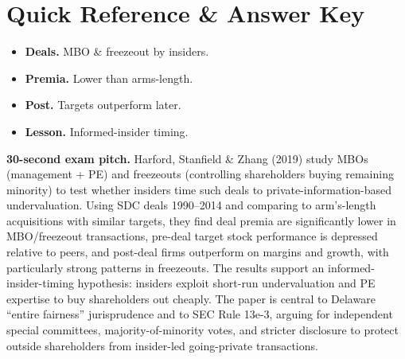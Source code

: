\documentclass[11pt]{article}
\begin{document}
\section*{Quick Reference \& Answer Key}
\begin{answerbox}
\begin{itemize}
\item \textbf{Deals.} MBO \& freezeout by insiders.
\item \textbf{Premia.} Lower than arms-length.
\item \textbf{Post.} Targets outperform later.
\item \textbf{Lesson.} Informed-insider timing.
\end{itemize}
\end{answerbox}

\begin{keybox}
\textbf{30-second exam pitch.} Harford, Stanfield \& Zhang (2019) study MBOs (management + PE) and freezeouts (controlling shareholders buying remaining minority) to test whether insiders time such deals to private-information-based undervaluation. Using SDC deals 1990--2014 and comparing to arm's-length acquisitions with similar targets, they find deal premia are significantly lower in MBO/freezeout transactions, pre-deal target stock performance is depressed relative to peers, and post-deal firms outperform on margins and growth, with particularly strong patterns in freezeouts. The results support an informed-insider-timing hypothesis: insiders exploit short-run undervaluation and PE expertise to buy shareholders out cheaply. The paper is central to Delaware ``entire fairness'' jurisprudence and to SEC Rule 13e-3, arguing for independent special committees, majority-of-minority votes, and stricter disclosure to protect outside shareholders from insider-led going-private transactions.
\end{keybox}
\end{document}
